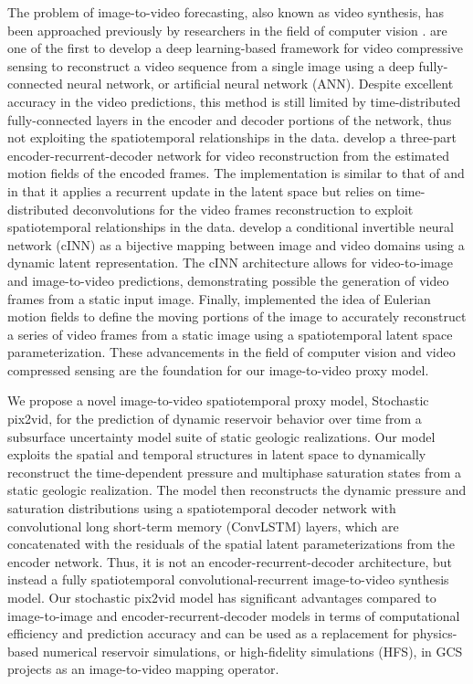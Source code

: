 \documentclass[10pt, twoside]{article}
\begin{document}
The problem of image-to-video forecasting, also known as video synthesis, has been approached previously by researchers in the field of computer vision \cite{vondrick2016generating, mathieu2016deep, villegas2018decomposing, tulyakov2017mocogan, NIPS2015_07563a3f}. \citet{iliadis2017deep} are one of the first to develop a deep learning-based framework for video compressive sensing to reconstruct a video sequence from a single image using a deep fully-connected neural network, or artificial neural network (ANN). Despite excellent accuracy in the video predictions, this method is still limited by time-distributed fully-connected layers in the encoder and decoder portions of the network, thus not exploiting the spatiotemporal relationships in the data. \citet{xu2018csvideonet} develop a three-part encoder-recurrent-decoder network for video reconstruction from the estimated motion fields of the encoded frames. The implementation is similar to that of \citet{Jiang2023} and \citet{Tang2020, Tang2021} in that it applies a recurrent update in the latent space but relies on time-distributed deconvolutions for the video frames reconstruction to exploit spatiotemporal relationships in the data. \citet{dorkenwald2021stochastic} develop a conditional invertible neural network (cINN) as a bijective mapping between image and video domains using a dynamic latent representation. The cINN architecture allows for video-to-image and image-to-video predictions, demonstrating possible the generation of video frames from a static input image. Finally, \citet{holynski2020animating} implemented the idea of Eulerian motion fields to define the moving portions of the image to accurately reconstruct a series of video frames from a static image using a spatiotemporal latent space parameterization. These advancements in the field of computer vision and video compressed sensing are the foundation for our image-to-video proxy model.

We propose a novel image-to-video spatiotemporal proxy model, Stochastic pix2vid, for the prediction of dynamic reservoir behavior over time from a subsurface uncertainty model suite of static geologic realizations. Our model exploits the spatial and temporal structures in latent space to dynamically reconstruct the time-dependent pressure and multiphase saturation states from a static geologic realization. The model then reconstructs the dynamic pressure and saturation distributions using a spatiotemporal decoder network with convolutional long short-term memory (ConvLSTM) layers, which are concatenated with the residuals of the spatial latent parameterizations from the encoder network. Thus, it is not an encoder-recurrent-decoder architecture, but instead a fully spatiotemporal convolutional-recurrent image-to-video synthesis model. Our stochastic pix2vid model has significant advantages compared to image-to-image and encoder-recurrent-decoder models in terms of computational efficiency and prediction accuracy and can be used as a replacement for physics-based numerical reservoir simulations, or high-fidelity simulations (HFS), in GCS projects as an image-to-video mapping operator. 
\end{document}

